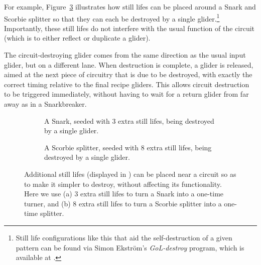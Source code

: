 For example, Figure~\ref{fig:snark_scorbie_seeded_destroy} illustrates how still lifes can be placed around a Snark and Scorbie splitter so that they can each be destroyed by a single glider.\footnote{Still life configurations like this that aid the self-destruction of a given pattern can be found via Simon Ekstr\"{o}m's \emph{GoL-destroy} program, which is available at .} Importantly, these still lifes do not interfere with the usual function of the circuit (which is to either reflect or duplicate a glider).

The circuit-destroying glider comes from the same direction as the usual input glider, but on a different lane. When destruction is complete, a glider is released, aimed at the next piece of circuitry that is due to be destroyed, with exactly the correct timing relative to the final recipe gliders. This allows circuit destruction to be triggered immediately, without having to wait for a return glider from far away as in a Snarkbreaker.

\begin{figure}[!htb]
	\centering
	\begin{subfigure}{0.455\textwidth}
		\centering
		\caption{A Snark, seeded with 3 extra still lifes, being destroyed by a single glider.}
		\label{fig:snark_seeded_destroy}
	\end{subfigure} \hfill %
	\begin{subfigure}{0.505\textwidth}
		\centering
		\caption{A Scorbie splitter, seeded with 8 extra still lifes, being destroyed by a single glider.}
		\label{fig:scorbie_splitter_seeded_destroy}
	\end{subfigure}
	\caption{Additional still lifes (displayed in ) can be placed near a circuit so as to make it simpler to destroy, without affecting its functionality. Here we use (a) 3 extra still lifes to turn a Snark into a one-time turner, and (b) 8 extra still lifes to turn a Scorbie splitter into a one-time splitter.}\label{fig:snark_scorbie_seeded_destroy}
\end{figure}

